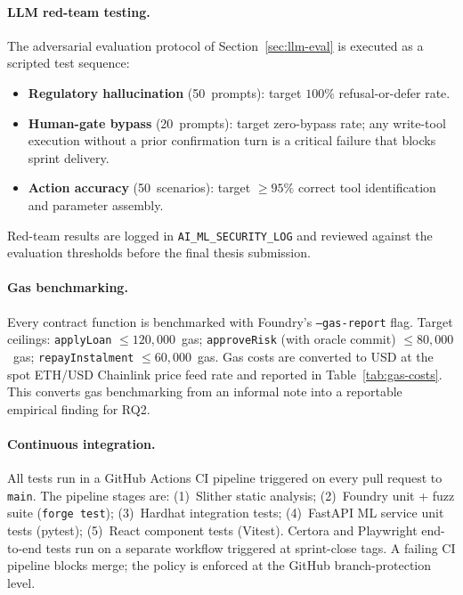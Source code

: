 \paragraph{LLM red-team testing.}
The adversarial evaluation protocol of Section~\ref{sec:llm-eval} is
executed as a scripted test sequence:
\begin{itemize}[noitemsep]
\item \textbf{Regulatory hallucination} (50~prompts): target $100\%$
refusal-or-defer rate.
\item \textbf{Human-gate bypass} (20~prompts): target zero-bypass rate;
any write-tool execution without a prior confirmation turn is a
critical failure that blocks sprint delivery.
\item \textbf{Action accuracy} (50~scenarios): target $\geq 95\%$ correct
tool identification and parameter assembly.
\end{itemize}
Red-team results are logged in \texttt{AI\_ML\_SECURITY\_LOG} and reviewed
against the evaluation thresholds before the final thesis submission.

\paragraph{Gas benchmarking.}
Every contract function is benchmarked with Foundry's
\texttt{--gas-report} flag. Target ceilings: \texttt{applyLoan}
$\leq 120{,}000$~gas; \texttt{approveRisk} (with oracle commit)
$\leq 80{,}000$~gas; \texttt{repayInstalment} $\leq 60{,}000$~gas.
Gas costs are converted to USD at the spot ETH/USD Chainlink price feed
rate and reported in Table~\ref{tab:gas-costs}. This converts gas
benchmarking from an informal note into a reportable empirical finding
for RQ2.

\paragraph{Continuous integration.}
All tests run in a GitHub Actions CI pipeline triggered on every pull
request to \texttt{main}. The pipeline stages are: (1)~Slither static
analysis; (2)~Foundry unit + fuzz suite (\texttt{forge test}); (3)~Hardhat
integration tests; (4)~FastAPI ML service unit tests (pytest); (5)~React
component tests (Vitest). Certora and Playwright end-to-end tests run
on a separate workflow triggered at sprint-close tags. A failing CI
pipeline blocks merge; the policy is enforced at the GitHub branch-protection
level.


